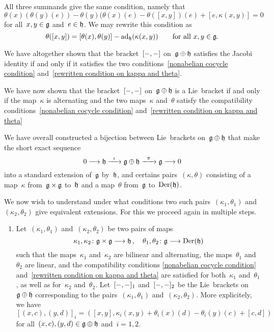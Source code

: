 \begin{fluff}
\begin{enumerate}
\begin{itemize*}
					All three summands give the same condition, namely that
					\[
						\theta(x)( \theta(y)(e) )
						-
						\theta(y)( \theta(x)(e)
						-
						\theta([x,y])(e)
						+
						[e, \kappa(x,y)]
						=
						0
					\]
					for all~$x, y \in \mathfrak{g}$ and~$e \in \mathfrak{h}$.
					We may rewrite this condition as
					\begin{equation}
						\label{rewritten condition on kappa and theta}
						\theta([x,y])
						=
						[\theta(x), \theta(y)]
						-
						\operatorname{ad}_{\mathfrak{h}}( \kappa(x,y) )
						\qquad
						\text{for all~$x, y \in \mathfrak{g}$.}
					\end{equation}
			\end{itemize*}
			We have altogether shown that the bracket~$[-, -]$ on~$\mathfrak{g} \oplus \mathfrak{h}$ satisfies the Jacobi identity if and only if it satisfies the two conditions~\eqref{nonabelian cocycle condition} and~\eqref{rewritten condition on kappa and theta}.

			We have now shown that the bracket~$[-, -]$ on~$\mathfrak{g} \oplus \mathfrak{h}$ is a Lie~bracket if and only if the map~$\kappa$ is alternating and the two maps~$\kappa$ and~$\theta$ satisfy the compatibility conditions~\eqref{nonabelian cocycle condition} and~\eqref{rewritten condition on kappa and theta}
	\end{enumerate}

	We have overall constructed a bijection between Lie~brackets on~$\mathfrak{g} \oplus \mathfrak{h}$ that make the short exact sequence
	\[
		0
		\to
		\hlie
		\xto{\iota}
		\glie \oplus \hlie
		\xto{\pi}
		\glie
		\to
		0
	\]
	into a standard extension of~$\mathfrak{g}$ by~$\mathfrak{h}$, and certains pairs~$(\kappa, \theta)$ consisting of a map~$\kappa$ from~$\mathfrak{g} \times \mathfrak{g}$ to~$\mathfrak{h}$ and a map~$\theta$ from~$\mathfrak{g}$ to~$\operatorname{Der}(\mathfrak{h})$.

	We now wish to understand under what conditions two such pairs~$(\kappa_1, \theta_1)$ and~$(\kappa_2, \theta_2)$ give equivalent extensions.
	For this we proceed again in multiple steps.

	\begin{enumerate}[resume*]
		\item
			Let~$(\kappa_1, \theta_1)$ and~$(\kappa_2, \theta_2)$ be two pairs of maps
			\[
				\kappa_1, \kappa_2
				\colon
				\glie \times \glie
				\to
				\hlie \,,
				\quad
				\theta_1, \theta_2
				\colon
				\glie
				\to
				\Der(\hlie)
			\]
			such that the maps~$\kappa_1$ and~$\kappa_2$ are bilinear and alternating, the maps~$\theta_1$ and~$\theta_2$ are linear, and the compatibility conditions \eqref{nonabelian cocycle condition} and~\eqref{rewritten condition on kappa and theta} are satisfied for both~$\kappa_1$ and~$\theta_1$, as well as for~$\kappa_2$ and~$\theta_2$.
			Let~$[-, -]_1$ and~$[-, -]_2$ be the Lie~brackets on~$\mathfrak{g} \oplus \mathfrak{h}$ corresponding to the pairs~$(\kappa_1, \theta_1)$ and~$(\kappa_2, \theta_2)$.
			More explicitely, we have
			\[
				[(x,c), (y,d)]_i
				=
				(
					[x,y],
					\kappa_i(x,y) + \theta_i(x)(d) - \theta_i(y)(c) + [c,d]
				)
			\]
			for all~$(x,c), (y,d) \in \mathfrak{g} \oplus \mathfrak{h}$ and~$i = 1, 2$.


\end{enumerate}
\end{fluff}
